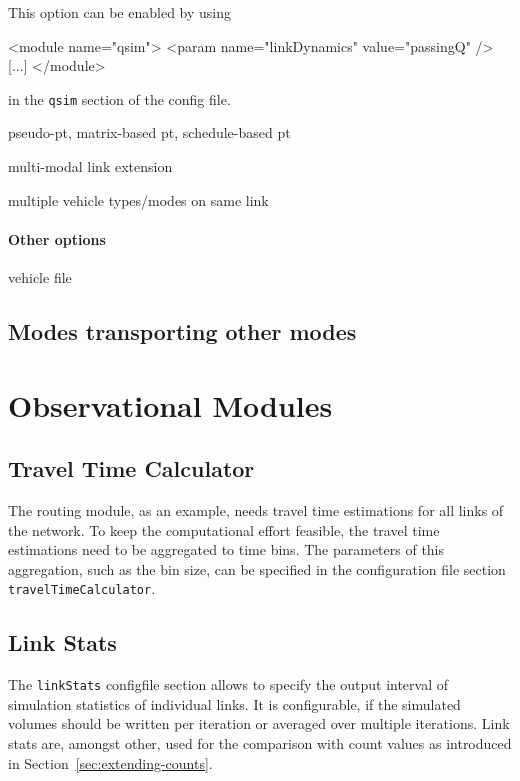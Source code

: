 This option can be enabled by using
\begin{xml}
<module name="qsim">
   <param name="linkDynamics" value="passingQ" />
   [...]
</module>
\end{xml}
in the \lstinline{qsim} section of the config file.



pseudo-pt, matrix-based pt, schedule-based pt

multi-modal link extension

multiple vehicle types/modes on same link

\paragraph{Other options}

vehicle file

\subsection{Modes transporting other modes}



\section{Observational Modules}
\label{sec:observational}

\subsection{Travel Time Calculator}
\label{sec:ttc}
The routing module, as an example, needs travel time estimations for all links of the network. To keep the computational effort feasible, the travel time estimations need to be aggregated to time bins. The parameters of this aggregation, such as the bin size, can be specified in the configuration file section \lstinline|travelTimeCalculator|.

\subsection{Link Stats}
\label{sec:linkStats}
The \lstinline|linkStats| \gls{configfile} section allows to specify the output interval of simulation statistics of individual links. It is configurable, if the simulated volumes should be written per iteration or averaged over multiple iterations. Link stats are, amongst other, used for the comparison with count values as introduced in Section~\ref{sec:extending-counts}. 


